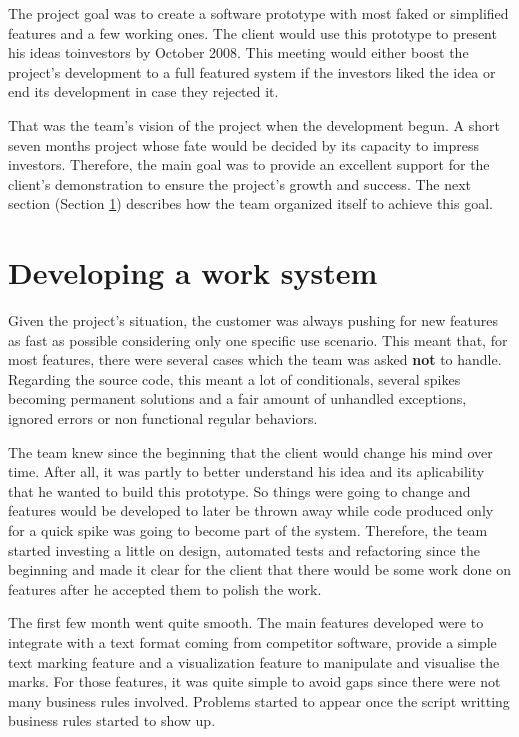 \documentclass[lnbip]{svmultln}
\begin{document}
The project goal was to create a software prototype with most faked or
simplified features and a few working ones. The client would use this
prototype to present his ideas toinvestors by October 2008. This
meeting would either boost the project's development to a full
featured system if the investors liked the idea or end its development
in case they rejected it.

That was the team's vision of the project when the development
begun. A short seven months project whose fate would be decided by its
capacity to impress investors. Therefore, the main goal was to provide
an excellent support for the client's demonstration to ensure the
project's growth and success. The next section (Section
\ref{sec:working}) describes how the team organized itself to achieve
this goal.

\section{Developing a work system}
\label{sec:working}

Given the project's situation, the customer was always pushing for new
features as fast as possible considering only one specific use
scenario. This meant that, for most features, there were several cases
which the team was asked \textbf{not} to handle. Regarding the source
code, this meant a lot of conditionals, several spikes becoming
permanent solutions and a fair amount of unhandled exceptions, ignored
errors or non functional regular behaviors.

The team knew since the beginning that the client would change his
mind over time. After all, it was partly to better understand his idea
and its aplicability that he wanted to build this prototype. So things
were going to change and features would be developed to later be
thrown away while code produced only for a quick spike was going to
become part of the system. Therefore, the team started investing a
little on design, automated tests and refactoring since the beginning
and made it clear for the client that there would be some work done on
features after he accepted them to polish the work.

The first few month went quite smooth. The main features developed
were to integrate with a text format coming from competitor software,
provide a simple text marking feature and a visualization feature to
manipulate and visualise the marks. For those features, it was quite
simple to avoid gaps since there were not many business rules
involved. Problems started to appear once the script writting business
rules started to show up.
\end{document}
